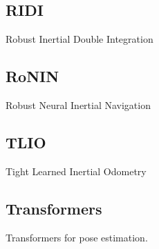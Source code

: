 \subsection{RIDI}
Robust Inertial Double Integration

\subsection{RoNIN}
Robust Neural Inertial Navigation

\subsection{TLIO}
Tight Learned Inertial Odometry

\subsection{Transformers}
Transformers for pose estimation.


